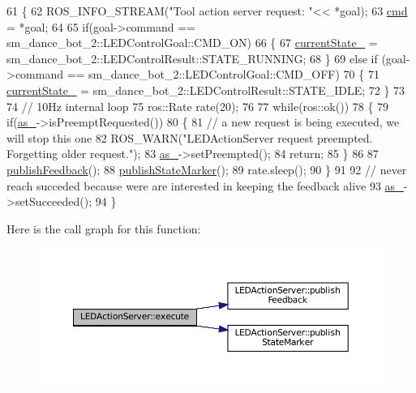 \begin{DoxyCode}
61 \{
62   ROS\_INFO\_STREAM(\textcolor{stringliteral}{"Tool action server request: "}<< *goal);
63   \hyperlink{classLEDActionServer_a4d3a4c07e7659cdd78228932bb1634d3}{cmd} = *goal;
64 
65   \textcolor{keywordflow}{if}(goal->command == sm\_dance\_bot\_2::LEDControlGoal::CMD\_ON)
66   \{
67     \hyperlink{classLEDActionServer_a1dc456e987dc331501ad6ff2215661ff}{currentState\_} =  sm\_dance\_bot\_2::LEDControlResult::STATE\_RUNNING;
68   \}
69   \textcolor{keywordflow}{else}  \textcolor{keywordflow}{if} (goal->command == sm\_dance\_bot\_2::LEDControlGoal::CMD\_OFF)
70   \{
71     \hyperlink{classLEDActionServer_a1dc456e987dc331501ad6ff2215661ff}{currentState\_} =  sm\_dance\_bot\_2::LEDControlResult::STATE\_IDLE;
72   \}
73 
74   \textcolor{comment}{// 10Hz internal loop}
75   ros::Rate rate(20);
76 
77   \textcolor{keywordflow}{while}(ros::ok())
78   \{
79     \textcolor{keywordflow}{if}(\hyperlink{classLEDActionServer_a61d21c77642081acf017d4ebd65b2de0}{as\_}->isPreemptRequested())
80     \{
81        \textcolor{comment}{// a new request is being executed, we will stop this one}
82        ROS\_WARN(\textcolor{stringliteral}{"LEDActionServer request preempted. Forgetting older request."});
83        \hyperlink{classLEDActionServer_a61d21c77642081acf017d4ebd65b2de0}{as\_}->setPreempted(); 
84        \textcolor{keywordflow}{return};
85     \}
86     
87     \hyperlink{classLEDActionServer_a25c93d4e7ecdacbb4f5b090d7789aa36}{publishFeedback}();
88     \hyperlink{classLEDActionServer_a73bb754ac2347c50660624ad92315895}{publishStateMarker}();
89     rate.sleep();
90   \}
91 
92    \textcolor{comment}{// never reach succeded because were are interested in keeping the feedback alive}
93    \hyperlink{classLEDActionServer_a61d21c77642081acf017d4ebd65b2de0}{as\_}->setSucceeded();
94 \}
\end{DoxyCode}
Here is the call graph for this function\+:
\nopagebreak
\begin{figure}[H]
\begin{center}
\leavevmode
\includegraphics[width=350pt]{classLEDActionServer_ae7cf81f53d16e3bdb5142df60b2017b3_cgraph}
\end{center}
\end{figure}
\mbox{\label{classLEDActionServer_aa7de924a8ea5f74b85d14782f4661a67}} 
